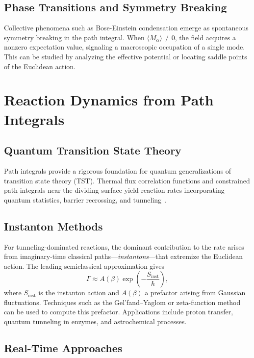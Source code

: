 \subsection{Phase Transitions and Symmetry Breaking}

Collective phenomena such as Bose-Einstein condensation emerge as spontaneous symmetry breaking in the path integral. When \(\langle M_\alpha \rangle \neq 0\), the field acquires a nonzero expectation value, signaling a macroscopic occupation of a single mode. This can be studied by analyzing the effective potential or locating saddle points of the Euclidean action.

\section{Reaction Dynamics from Path Integrals}
\label{sec:path_integral_reactions}

\subsection{Quantum Transition State Theory}

Path integrals provide a rigorous foundation for quantum generalizations of transition state theory (TST). Thermal flux correlation functions and constrained path integrals near the dividing surface yield reaction rates incorporating quantum statistics, barrier recrossing, and tunneling~\cite{Voth1989, Miller1998}.

\subsection{Instanton Methods}

For tunneling-dominated reactions, the dominant contribution to the rate arises from imaginary-time classical paths—\emph{instantons}—that extremize the Euclidean action. The leading semiclassical approximation gives
\begin{equation}
	\Gamma \approx A(\beta) \exp\left(-\frac{S_{\text{inst}}}{\hbar}\right),
	\label{eq:instanton_rate}
\end{equation}
where \(S_{\text{inst}}\) is the instanton action and \(A(\beta)\) a prefactor arising from Gaussian fluctuations. Techniques such as the Gel'fand–Yaglom or zeta-function method can be used to compute this prefactor. Applications include proton transfer, quantum tunneling in enzymes, and astrochemical processes.

\subsection{Real-Time Approaches}

